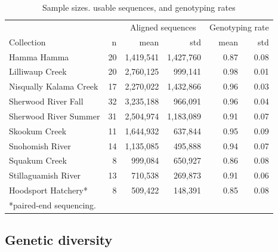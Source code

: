 \documentclass[12pt, one column]{article}
\begin{document}
\begin{table}[H]
\caption{\label{tab:table-name}Sample sizes. usable sequences, and genotyping rates}

\begin{tabular}{lrrrrr}
\toprule
{} & {} & \multicolumn{2}{c}{Aligned sequences} & \multicolumn{2}{c}{Genotyping rate}\\
Collection &  n   &            mean &        std &              mean &       std \\
\midrule
Hamma Hamma            &  20 &         1,419,541 & 1,427,760 &            0.87 &       0.08 \\
Lilliwaup Creek        &  20 &         2,760,125 &   999,141 &            0.98 &       0.01 \\
Nisqually Kalama Creek &  17 &         2,270,022 & 1,432,866 &            0.96 &       0.03 \\
Sherwood River Fall    &  32 &         3,235,188 &   966,091 &            0.96 &       0.04 \\
Sherwood River Summer  &  31 &         2,504,974 & 1,183,089 &            0.91 &       0.07 \\
Skookum Creek          &  11 &         1,644,932 &   637,844 &            0.95 &       0.09 \\
Snohomish River        &  14 &         1,135,085 &   495,888 &            0.94 &       0.07 \\
Squakum Creek          &   8 &           999,084 &   650,927 &            0.86 &       0.08 \\
Stillaguamish River    &  13 &           710,538 &   269,873 &            0.91 &       0.06 \\
\midrule
Hoodsport Hatchery*    &   8 &           509,422 &   148,391 &            0.85 &       0.08 \\
\bottomrule
\multicolumn{6}{l}{*paired-end sequencing.}
5\end{tabular}

\end {table}

\subsection*{Genetic diversity} 
\end{document}
